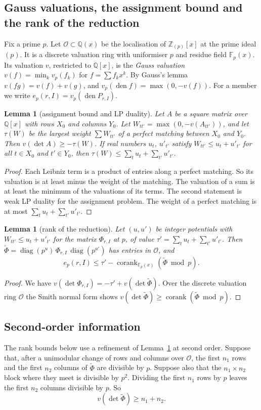 \documentclass[11pt]{amsart}
\newtheorem{lemma}[theorem]{Lemma}
\theoremstyle{definition}
\theoremstyle{remark}
\numberwithin{equation}{section}
\newcommand{\Z}{\mathbb Z}
\newcommand{\Q}{\mathbb Q}
\newcommand{\F}{\mathbb F}
\newcommand{\den}{\operatorname{den}}
\newcommand{\corank}{\operatorname{corank}}
\newcommand{\cO}{\mathcal O}
\begin{document}
\subsection{Gauss valuations, the assignment bound and the rank of the reduction}
Fix a prime $p$. Let $\cO\subset\Q(x)$ be the localisation of $\Z_{(p)}[x]$ at the prime ideal $(p)$. It is a discrete
valuation ring with uniformiser $p$ and residue field $\F_p(x)$. Its valuation $v$, restricted to $\Q[x]$, is the
\emph{Gauss valuation} $v(f)=\min_k v_p(f_k)$ for $f=\sum f_kx^k$. By Gauss's lemma $v(fg)=v(f)+v(g)$, and
$v_p(\den f)=\max(0,-v(f))$. For a member we write $e_p(r,I)=v_p(\den P_{r,I})$.

\begin{lemma}[assignment bound and LP duality]\label{lem:trop}
Let $A$ be a square matrix over $\Q[x]$ with rows $X_0$ and columns $Y_0$. Let $W_{tt'}=\max(0,-v(A_{tt'}))$, and let
$\tau(W)$ be the largest weight $\sum W_{tt'}$ of a perfect matching between $X_0$ and $Y_0$. Then
$v(\det A)\ge-\tau(W)$. If real numbers $u_t$, $u'_{t'}$ satisfy $W_{tt'}\le u_t+u'_{t'}$ for all $t\in X_0$ and
$t'\in Y_0$, then $\tau(W)\le\sum_tu_t+\sum_{t'}u'_{t'}$.
\end{lemma}
\begin{proof}
Each Leibniz term is a product of entries along a perfect matching. So its valuation is at least minus the weight of the
matching. The valuation of a sum is at least the minimum of the valuations of its terms. The second statement is weak
LP duality for the assignment problem. The weight of a perfect matching is at most $\sum_tu_t+\sum_{t'}u'_{t'}$.
\end{proof}

\begin{lemma}[rank of the reduction]\label{lem:rank}
Let $(u,u')$ be integer potentials with $W_{tt'}\le u_t+u'_{t'}$ for the matrix $\Phi_{r,I}$ at $p$, of value
$\tau'=\sum_tu_t+\sum_{t'}u'_{t'}$. Then $\widetilde\Phi=\operatorname{diag}(p^{u})\,\Phi_{r,I}\,
\operatorname{diag}(p^{u'})$ has entries in $\cO$, and
\[
 e_p(r,I)\le\tau'-\corank_{\F_p(x)}(\widetilde\Phi\bmod p).
\]
\end{lemma}
\begin{proof}
We have $v(\det\Phi_{r,I})=-\tau'+v(\det\widetilde\Phi)$. Over the discrete valuation ring $\cO$ the Smith normal form
shows $v(\det\widetilde\Phi)\ge\corank(\widetilde\Phi\bmod p)$.
\end{proof}

\subsection{Second-order information}\label{ssec:second}
The rank bounds below use a refinement of Lemma~\ref{lem:rank} at second order. Suppose that, after a unimodular change
of rows and columns over $\cO$, the first $n_1$ rows and the first $n_2$ columns of $\widetilde\Phi$ are divisible by
$p$. Suppose also that the $n_1\times n_2$ block where they meet is divisible by $p^2$. Dividing the first $n_1$ rows by
$p$ leaves the first $n_2$ columns divisible by $p$. So
\begin{equation}\label{eq:corner}
 v(\det\widetilde\Phi)\ge n_1+n_2 .
\end{equation}
\end{document}
